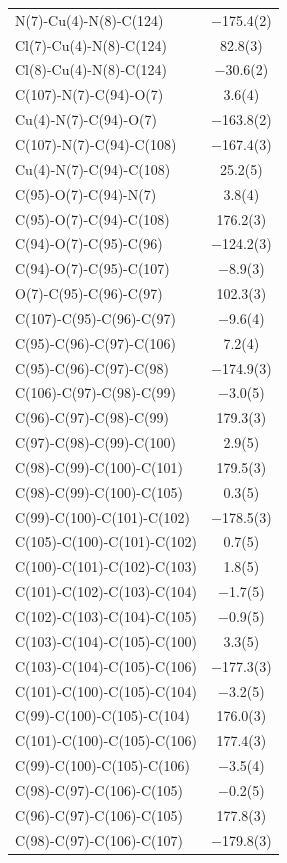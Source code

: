 \begin{center}
{\begin{supertabular}{p{1.8in}c}
N(7)-Cu(4)-N(8)-C(124)&$-$175.4(2)\\
Cl(7)-Cu(4)-N(8)-C(124)&82.8(3)\\
Cl(8)-Cu(4)-N(8)-C(124)&$-$30.6(2)\\
C(107)-N(7)-C(94)-O(7)&3.6(4)\\
Cu(4)-N(7)-C(94)-O(7)&$-$163.8(2)\\
C(107)-N(7)-C(94)-C(108)&$-$167.4(3)\\
Cu(4)-N(7)-C(94)-C(108)&25.2(5)\\
C(95)-O(7)-C(94)-N(7)&3.8(4)\\
C(95)-O(7)-C(94)-C(108)&176.2(3)\\
C(94)-O(7)-C(95)-C(96)&$-$124.2(3)\\
C(94)-O(7)-C(95)-C(107)&$-$8.9(3)\\
O(7)-C(95)-C(96)-C(97)&102.3(3)\\
C(107)-C(95)-C(96)-C(97)&$-$9.6(4)\\
C(95)-C(96)-C(97)-C(106)&7.2(4)\\
C(95)-C(96)-C(97)-C(98)&$-$174.9(3)\\
C(106)-C(97)-C(98)-C(99)&$-$3.0(5)\\
C(96)-C(97)-C(98)-C(99)&179.3(3)\\
C(97)-C(98)-C(99)-C(100)&2.9(5)\\
C(98)-C(99)-C(100)-C(101)&179.5(3)\\
C(98)-C(99)-C(100)-C(105)&0.3(5)\\
C(99)-C(100)-C(101)-C(102)&$-$178.5(3)\\
C(105)-C(100)-C(101)-C(102)&0.7(5)\\
C(100)-C(101)-C(102)-C(103)&1.8(5)\\
C(101)-C(102)-C(103)-C(104)&$-$1.7(5)\\
C(102)-C(103)-C(104)-C(105)&$-$0.9(5)\\
C(103)-C(104)-C(105)-C(100)&3.3(5)\\
C(103)-C(104)-C(105)-C(106)&$-$177.3(3)\\
C(101)-C(100)-C(105)-C(104)&$-$3.2(5)\\
C(99)-C(100)-C(105)-C(104)&176.0(3)\\
C(101)-C(100)-C(105)-C(106)&177.4(3)\\
C(99)-C(100)-C(105)-C(106)&$-$3.5(4)\\
C(98)-C(97)-C(106)-C(105)&$-$0.2(5)\\
C(96)-C(97)-C(106)-C(105)&177.8(3)\\
C(98)-C(97)-C(106)-C(107)&$-$179.8(3)\\

\end{supertabular}}
\end{center}
